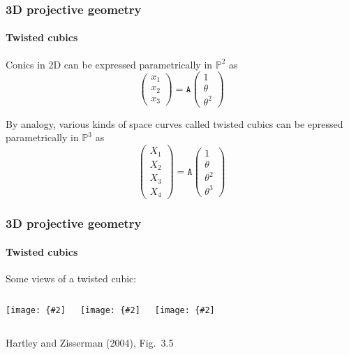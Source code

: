 \documentclass[aspectratio=169]{beamer}
\newcommand{\mat}[1]{\mathtt{#1}}
\def\Pset{\mathbb{P}}
\newcommand{\myfig}[3]{\centerline{\texttt{[image: \{\#2]}}}
    \centerline{\scriptsize #3}}
\begin{document}
\begin{frame}
\frametitle{3D projective geometry}
\framesubtitle{Twisted cubics}

Conics in 2D can be expressed parametrically in $\Pset^2$ as
\begin{equation}
\begin{pmatrix} x_1 \\ x_2 \\ x_3 \end{pmatrix} =
\mat{A} \begin{pmatrix} 1 \\ \theta \\ \theta^2 \end{pmatrix}
\end{equation}

\medskip

By analogy, various kinds of space curves called \alert{twisted
cubics} can be epressed parametrically in $\Pset^3$ as
\begin{equation}
\begin{pmatrix} X_1 \\ X_2 \\ X_3 \\ X_4 \end{pmatrix} =
\mat{A} \begin{pmatrix} 1 \\ \theta \\ \theta^2 \\ \theta^3 \end{pmatrix}
\end{equation}

\medskip

\end{frame}

\begin{frame}
\frametitle{3D projective geometry}
\framesubtitle{Twisted cubics}

Some views of a twisted cubic:
\begin{columns}
\column{1.3in}
\myfig{1.3in}{HZ-fig2-5a}{}
\column{1.3in}
\myfig{1.3in}{HZ-fig2-5b}{}
\column{1.3in}
\myfig{1.3in}{HZ-fig2-5c}{}
\end{columns}
\centerline{Hartley and Zisserman (2004), Fig.\ 3.5}

\end{frame}
\end{document}
